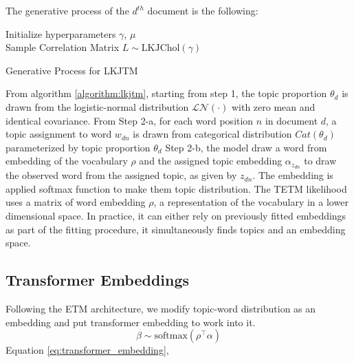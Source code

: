 The generative process of the $ d^{th} $ document is the following:\\
\begin{algorithm}[H]
Initialize hyperparameters $ \gamma $, $ \mu $\\
Sample Correlation Matrix $ L\sim \text{LKJChol}(\gamma)$\\
\caption{Generative Process for LKJTM}
\label{algorithm:lkjtm}
\end{algorithm}
From algorithm \ref{algorithm:lkjtm}, starting from step 1, the topic proportion $ \theta_d $ is drawn from the logistic-normal distribution $ \mathcal{LN}(\cdot) $ with zero mean and identical covariance.
From Step 2-a, for each word position $ n $ in document $ d $, a topic assignment to word $ w_{dn} $ is drawn from categorical distribution $ Cat(\theta_d) $ parameterized by topic proportion $ \theta_d $
Step 2-b, the model draw a word from embedding of the vocabulary $ \rho $ and the assigned topic embedding $ \alpha_{z_{dn}} $ to draw the observed word from the assigned topic, as given by $ z_{dn} $. The embedding is applied softmax function to make them topic distribution.
The TETM likelihood uses a matrix of word embedding $ \rho $, a representation of the vocabulary in a lower dimensional space. In practice, it can either rely on previously fitted embeddings as part of the fitting procedure, it simultaneously finds topics and an embedding space.


\subsection{Transformer Embeddings}
Following the ETM architecture, we modify topic-word distribution as an embedding and put transformer embedding to work into it. 
\begin{equation}\label{eq:transformer_embedding}
\beta\sim\text{softmax}(\rho^\top\alpha)
\end{equation}
Equation \ref{eq:transformer_embedding}, 

